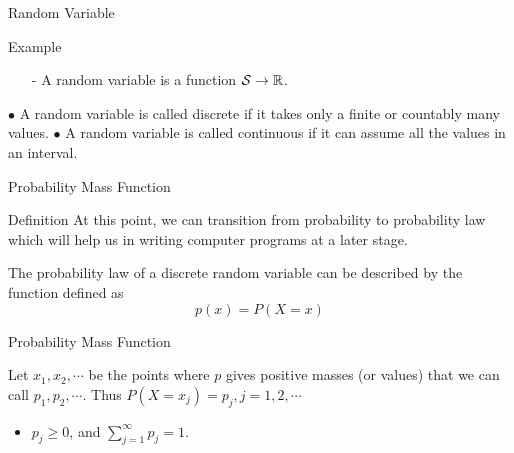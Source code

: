 \documentclass[aspectratio=169,xcolor=dvipsnames,svgnames,x11names,fleqn]{beamer}
\begin{document}
\begin{frame}[containsverbatim]{Random Variable}
    \begin{tblock}{Example}

        {\color{blue}{For example, the probability that a random variable takes the value of 2 would be expressed as $P(X = 2)$ where $x = 2$.}}
    
        
        \begin{itemize}
            \item[-] A random variable is a function ${\mathcal S} \to {\mathbb R}$.
        \end{itemize}
    
    $\bullet$ A random variable is called discrete if it takes only a finite or countably many values.\newline
    $\bullet$ A random variable is called continuous if it can assume all the values in an interval.
    \end{tblock}
    
\end{frame}

\begin{frame}[containsverbatim]{Probability Mass Function}
    
    \begin{gradblock}{Definition}
        At this point, we can transition from probability to probability law which will help us in writing computer programs at a later stage.
    
        The probability law of a discrete random variable can be described by the function defined as 
        \begin{equation}
            p(x) = P(X = x)
        \end{equation}
    \end{gradblock}

\end{frame}

\begin{frame}[containsverbatim]{Probability Mass Function}
    
    
    Let $x_1, x_2, \cdots $ be the points where $p$ gives positive masses (or values) that we can call $p_1, p_2, \cdots$. Thus $P(X = x_j) = p_j, j = 1, 2, \cdots $
    \begin{itemize}
        \item $p_j \geq 0$, and $\sum_{j= 1}^\infty p_j = 1$.
    \end{itemize}

\end{frame}
\end{document}
